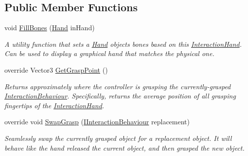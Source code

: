 \subsection*{Public Member Functions}
\begin{DoxyCompactItemize}
\item 
void \mbox{\hyperlink{class_leap_1_1_unity_1_1_interaction_1_1_interaction_hand_a39457043d21af87fcbcf45c8c0876b1e}{Fill\+Bones}} (\mbox{\hyperlink{class_leap_1_1_hand}{Hand}} in\+Hand)
\begin{DoxyCompactList}\small\item\em A utility function that sets a \mbox{\hyperlink{class_leap_1_1_hand}{Hand}} object\textquotesingle{}s bones based on this \mbox{\hyperlink{class_leap_1_1_unity_1_1_interaction_1_1_interaction_hand}{Interaction\+Hand}}. Can be used to display a graphical hand that matches the physical one. \end{DoxyCompactList}\item 
override Vector3 \mbox{\hyperlink{class_leap_1_1_unity_1_1_interaction_1_1_interaction_hand_ad3db830a66914a000a05003b36b4596d}{Get\+Grasp\+Point}} ()
\begin{DoxyCompactList}\small\item\em Returns approximately where the controller is grasping the currently-\/grasped \mbox{\hyperlink{class_leap_1_1_unity_1_1_interaction_1_1_interaction_behaviour}{Interaction\+Behaviour}}. Specifically, returns the average position of all grasping fingertips of the \mbox{\hyperlink{class_leap_1_1_unity_1_1_interaction_1_1_interaction_hand}{Interaction\+Hand}}. \end{DoxyCompactList}\item 
override void \mbox{\hyperlink{class_leap_1_1_unity_1_1_interaction_1_1_interaction_hand_a0a175ec3d49aae78a5c6951fd744080b}{Swap\+Grasp}} (\mbox{\hyperlink{interface_leap_1_1_unity_1_1_interaction_1_1_i_interaction_behaviour}{I\+Interaction\+Behaviour}} replacement)
\begin{DoxyCompactList}\small\item\em Seamlessly swap the currently grasped object for a replacement object. It will behave like the hand released the current object, and then grasped the new object. \end{DoxyCompactList}\end{DoxyCompactItemize}
